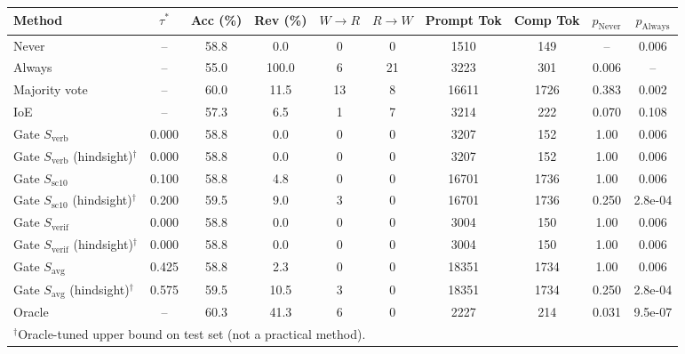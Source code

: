 \begin{tabular}{lccccccccc}
\toprule
Method & $\tau^*$ & Acc (\%) & Rev (\%) & $W\to R$ & $R\to W$ & Prompt Tok & Comp Tok & $p_{\text{Never}}$ & $p_{\text{Always}}$ \\
\midrule
Never & -- & 58.8 & 0.0 & 0 & 0 & 1510 & 149 & -- & 0.006 \\
Always & -- & 55.0 & 100.0 & 6 & 21 & 3223 & 301 & 0.006 & -- \\
Majority vote & -- & 60.0 & 11.5 & 13 & 8 & 16611 & 1726 & 0.383 & 0.002 \\
IoE & -- & 57.3 & 6.5 & 1 & 7 & 3214 & 222 & 0.070 & 0.108 \\
\midrule
Gate $S_{\text{verb}}$ & 0.000 & 58.8 & 0.0 & 0 & 0 & 3207 & 152 & 1.00 & 0.006 \\
Gate $S_{\text{verb}}$ (hindsight)$^\dagger$ & 0.000 & 58.8 & 0.0 & 0 & 0 & 3207 & 152 & 1.00 & 0.006 \\
Gate $S_{\text{sc10}}$ & 0.100 & 58.8 & 4.8 & 0 & 0 & 16701 & 1736 & 1.00 & 0.006 \\
Gate $S_{\text{sc10}}$ (hindsight)$^\dagger$ & 0.200 & 59.5 & 9.0 & 3 & 0 & 16701 & 1736 & 0.250 & 2.8e-04 \\
Gate $S_{\text{verif}}$ & 0.000 & 58.8 & 0.0 & 0 & 0 & 3004 & 150 & 1.00 & 0.006 \\
Gate $S_{\text{verif}}$ (hindsight)$^\dagger$ & 0.000 & 58.8 & 0.0 & 0 & 0 & 3004 & 150 & 1.00 & 0.006 \\
Gate $S_{\text{avg}}$ & 0.425 & 58.8 & 2.3 & 0 & 0 & 18351 & 1734 & 1.00 & 0.006 \\
Gate $S_{\text{avg}}$ (hindsight)$^\dagger$ & 0.575 & 59.5 & 10.5 & 3 & 0 & 18351 & 1734 & 0.250 & 2.8e-04 \\
\midrule
Oracle & -- & 60.3 & 41.3 & 6 & 0 & 2227 & 214 & 0.031 & 9.5e-07 \\
\bottomrule
\multicolumn{10}{l}{\footnotesize $^\dagger$Oracle-tuned upper bound on test set (not a practical method).}\\
\end{tabular}
